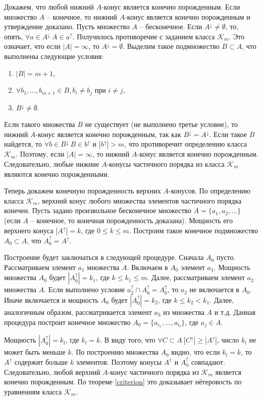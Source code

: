 \documentclass[12pt]{article}
\theoremstyle{break}
\def\K{\mathcal{K}_m}
\begin{document}
		Докажем, что любой нижний $A$-конус является конечно порожденным. Если множество $A$ -- конечное, то нижний $A$-конус является конечно порожденным и утверждение доказано. Пусть множество $A$ -- бесконечное. Если $A^{\downarrow} \neq \emptyset$, то, опять, $\forall a\in A^{\downarrow}~A\in a^{\uparrow}$. Получилось противоречие с заданием класса $\K$. Это означает, что если $|A| = \infty$, то $A^{\downarrow} = \emptyset$. Выделим такое подмножество $B\subset A$, что выполнены следующие условия:
		\begin{enumerate}
			\item $|B| = m + 1$,
			\item $\forall b_1,\dots,b_{m+1}\in B, b_i\neq b_j$ при $i\neq j$,
			\item $B^{\downarrow} \neq \emptyset$.
		\end{enumerate}
		Если такого множества $B$ не существует (не выполнено третье условие), то нижний $A$-конус является конечно порожденным, так как $B^{\downarrow} = A^{\downarrow}$. Если такое $B$ найдется, то $\forall b\in B^{\downarrow}~B\in b^{\uparrow}$ и $|b^{\uparrow}| > m$, что противоречит определению класса $\K$. Поэтому, если $|A|=\infty$, то нижний $A$-конус является конечно порожденным. Следовательно, любые нижние $A$-конусы частичного порядка из класса $\K$ являются конечно порожденными.

		Теперь докажем конечную порожденность верхних $A$-конусов. По определению класса $\K$, верхний конус любого множества элементов частичного порядка конечен. Пусть задано произвольное бесконечное множество $A = \{a_1, a_2,\dots\}$ (если $A$ -- конечное, то конечная порожденность доказана). Мощность его верхнего конуса $|A^{\uparrow}| = k$, где $0\leqslant k\leqslant m$. Построим такое конечное подмножество $A_0\subset A$, что $A_0^{\uparrow} = A^{\uparrow}$.

		Построение будет заключаться в следующей процедуре. Сначала $A_0$ пусто. Рассматриваем элемент $a_1$ множества $A$. Включаем в $A_0$ элемент $a_1$. Мощность множества $A_0$ будет $|A_0^{\uparrow}| = k_1$, где $k\leqslant k_1\leqslant m$. Далее, рассматриваем элемент $a_2$ множества $A$. Если выполнено условие $a_2^{\uparrow} \cap A_0^{\uparrow} = A_0^{\uparrow}$, то $a_2$ не включается в $A_0$. Иначе включается и мощность $A_0$ будет $|A_0^{\uparrow}| = k_2$, где $k\leqslant k_2 < k_1$. Далее, аналогичным образом, рассматривается элемент $a_3$ из множества $A$ и т.д. Данная процедура построит конечное множество $A_0=\{a_{i_1},\dots, a_{i_l}\}$, где $a_j\in A$.

		Мощность $|A_0^{\uparrow}| = k_l$, где $k_l = k$. В виду того, что $\forall C\subset A~|C^{\uparrow}| \geqslant |A^{\uparrow}|$, число $k_l$ не может быть меньше $k$. По построению множества $A_0$ видно, что если $k_l = k$, то $A^{\uparrow}$ содержит больше $k$ элементов. Поэтому конусы $A^{\uparrow}$ и $A_0^{\uparrow}$ совпадают. Следовательно, любой верхний $A$-конус частичного порядка из $\K$ является конечно порожденным. По теореме \ref{criterion} это доказывает нётеровость по уравнениям класса $\K$.

		
	
\end{document}
